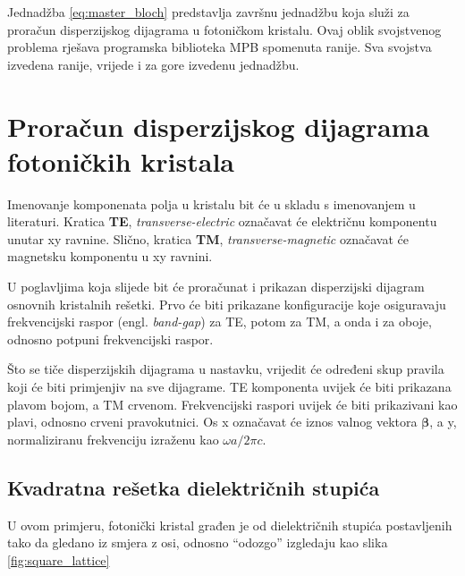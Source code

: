 \documentclass[utf8, seminar]{fer}
\begin{document}
Jednadžba \ref{eq:master_bloch} predstavlja završnu jednadžbu koja služi za
proračun disperzijskog dijagrama u fotoničkom kristalu. Ovaj oblik
svojstvenog problema rješava programska biblioteka MPB spomenuta ranije. Sva
svojstva izvedena ranije, vrijede i za gore izvedenu jednadžbu.

\chapter{Proračun disperzijskog dijagrama fotoničkih kristala}

Imenovanje komponenata polja u kristalu bit će u skladu s imenovanjem u
literaturi. Kratica \textbf{TE},
\textit{transverse-electric} označavat će električnu komponentu unutar xy ravnine.
Slično, kratica \textbf{TM}, \textit{transverse-magnetic} označavat će magnetsku
komponentu u xy ravnini.

U poglavljima koja slijede bit će proračunat i prikazan disperzijski dijagram
osnovnih kristalnih rešetki. Prvo će biti prikazane konfiguracije koje
osiguravaju frekvencijski raspor (engl. \textit{band-gap}) za TE, potom za TM, a
onda i za oboje, odnosno potpuni frekvencijski raspor.

Što se tiče disperzijskih dijagrama u nastavku, vrijedit će određeni skup pravila
koji će biti primjenjiv na sve dijagrame. TE komponenta uvijek će biti prikazana
plavom bojom, a TM crvenom. Frekvencijski raspori uvijek će biti prikazivani kao
plavi, odnosno crveni pravokutnici. Os x označavat će iznos valnog vektora
$\mathbf{\beta}$, a y, normaliziranu frekvenciju izraženu kao
${\omega a/ 2 \pi c}$.

\section{Kvadratna rešetka dielektričnih stupića}

U ovom primjeru, fotonički kristal građen je od dielektričnih stupića
postavljenih tako da gledano iz smjera z osi, odnosno ``odozgo'' izgledaju kao
slika \ref{fig:square_lattice}
\end{document}
